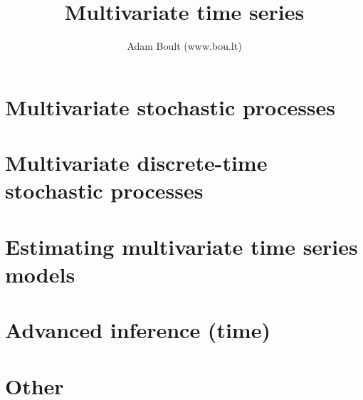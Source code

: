 \documentclass[oneside]{book}
\begin{document}
\author{Adam Boult (www.bou.lt)}
\title{Multivariate time series}
\maketitle

\setcounter{tocdepth}{0}
\tableofcontents



\part{Multivariate stochastic processes}



\part{Multivariate discrete-time stochastic processes}





\part{Estimating multivariate time series models}


\part{Advanced inference (time)}




\part{Other}

\end{document}
